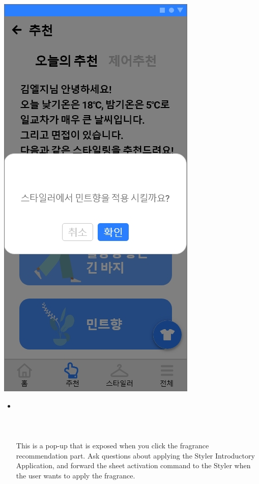 \documentclass[conference]{IEEEtran}
\begin{document}
\begin{enumerate}
{                \includegraphics[scale=0.25]{assets/추천5.jpg}}
    \begin{itemize}
    \item[] \\ \\ \\ \\ This is a pop-up that is exposed when you click the fragrance recommendation part. Ask questions about applying the Styler Introductory Application, and forward the sheet activation command to the Styler when the user wants to apply the fragrance.\\
\end{itemize}
\end{enumerate}
\end{document}
